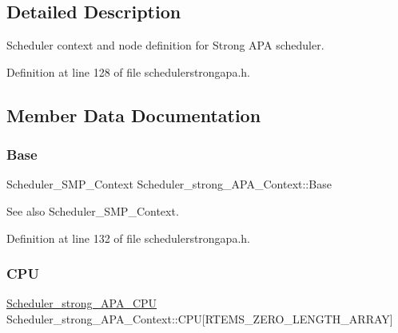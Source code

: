 \subsection{Detailed Description}
Scheduler context and node definition for Strong A\+PA scheduler. 

Definition at line 128 of file schedulerstrongapa.\+h.



\subsection{Member Data Documentation}
\mbox{\label{structScheduler__strong__APA__Context_a55755b445b7e7beaf1b87b178521e615}} 
\subsubsection{\texorpdfstring{Base}{Base}}
{\footnotesize\ttfamily Scheduler\+\_\+\+S\+M\+P\+\_\+\+Context Scheduler\+\_\+strong\+\_\+\+A\+P\+A\+\_\+\+Context\+::\+Base}

\begin{DoxySeeAlso}{See also}
Scheduler\+\_\+\+S\+M\+P\+\_\+\+Context. 
\end{DoxySeeAlso}


Definition at line 132 of file schedulerstrongapa.\+h.

\mbox{\label{structScheduler__strong__APA__Context_afdc7dcc1fef07a07130a8ddde0895e9c}} 
\subsubsection{\texorpdfstring{C\+PU}{CPU}}
{\footnotesize\ttfamily \hyperlink{structScheduler__strong__APA__CPU}{Scheduler\+\_\+strong\+\_\+\+A\+P\+A\+\_\+\+C\+PU} Scheduler\+\_\+strong\+\_\+\+A\+P\+A\+\_\+\+Context\+::\+C\+PU\mbox{[}R\+T\+E\+M\+S\+\_\+\+Z\+E\+R\+O\+\_\+\+L\+E\+N\+G\+T\+H\+\_\+\+A\+R\+R\+AY\mbox{]}}



